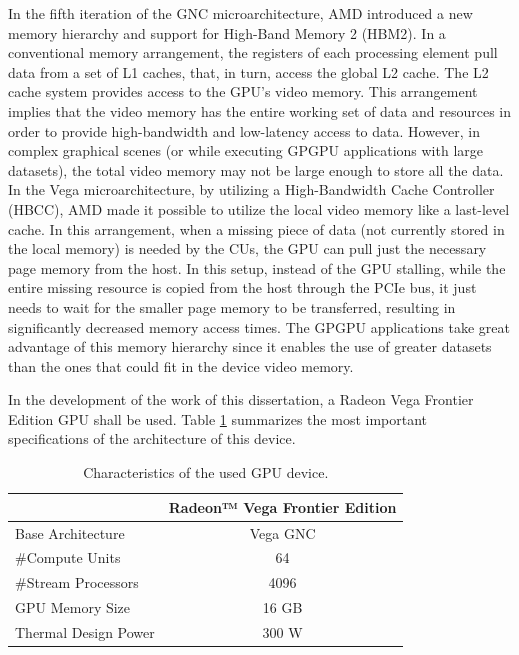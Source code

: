 In the fifth iteration of the GNC microarchitecture, AMD introduced a new memory hierarchy and support for High-Band Memory 2 (HBM2). In a conventional memory arrangement, the registers of each processing element pull data from a set of L1 caches, that, in turn, access the global L2 cache. The L2 cache system provides access to the GPU's video memory. This arrangement implies that the video memory has the entire working set of data and resources in order to provide high-bandwidth and low-latency access to data. However, in complex graphical scenes (or while executing GPGPU applications with large datasets), the total video memory may not be large enough to store all the data. In the Vega microarchitecture, by utilizing a  High-Bandwidth Cache Controller (HBCC), AMD made it possible to utilize the local video memory like a last-level cache. In this arrangement, when a missing piece of data (not currently stored in the local memory) is needed by the CUs, the GPU can pull just the necessary page memory from the host. In this setup, instead of the GPU stalling, while the entire missing resource is copied from the host through the PCIe bus, it just needs to wait for the smaller page memory to be transferred, resulting in significantly decreased memory access times. The GPGPU applications take great advantage of this memory hierarchy since it enables the use of greater datasets than the ones that could fit in the device video memory.

In the development of the work of this dissertation, a Radeon Vega Frontier Edition GPU shall be used. Table \ref{tab:gpusepcs} summarizes the most important specifications of the architecture of this device.

\begin{table}[!htb]
    \renewcommand{\arraystretch}{1.2} %
    \centering
        \begin{tabular}{lc}
            \multicolumn{1}{c}{\textbf{}} & \multicolumn{1}{l}{\textbf{Radeon™ Vega Frontier Edition}} \\ \hline
            Base Architecture             & Vega GNC                                                   \\
            \#Compute Units               & 64                                                         \\
            \#Stream Processors           & 4096                                                       \\
            GPU Memory Size               & 16 GB                                                      \\
            Thermal Design Power          & 300 W                                                      \\ \hline
        \end{tabular}
    \caption{Characteristics of the used GPU device.}
    \label{tab:gpusepcs}
\end{table}

